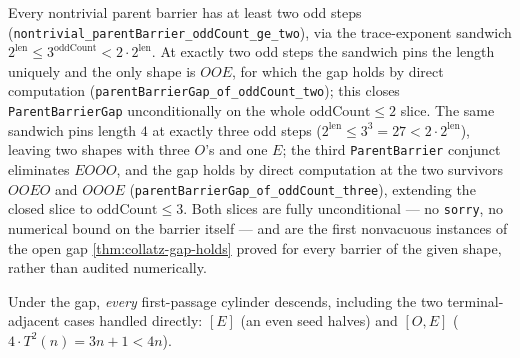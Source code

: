 \begin{theorem}
  \label{thm:collatz-gap-small-oddcount-slice}
  \leanok
  Every nontrivial parent barrier has at least two odd steps
  (\texttt{nontrivial\_parentBarrier\_oddCount\_ge\_two}), via the trace-exponent
  sandwich $2^{\mathrm{len}}\le3^{\mathrm{oddCount}}<2\cdot2^{\mathrm{len}}$. At
  exactly two odd steps the sandwich pins the length uniquely and the only shape is
  $OOE$, for which the gap holds by direct computation
  (\texttt{parentBarrierGap\_of\_oddCount\_two}); this closes
  \texttt{ParentBarrierGap} unconditionally on the whole $\mathrm{oddCount}\le2$
  slice. The same sandwich pins length $4$ at exactly three odd steps
  ($2^{\mathrm{len}}\le3^3=27<2\cdot2^{\mathrm{len}}$), leaving two shapes with
  three $O$'s and one $E$; the third \texttt{ParentBarrier} conjunct eliminates
  $EOOO$, and the gap holds by direct computation at the two survivors $OOEO$ and
  $OOOE$ (\texttt{parentBarrierGap\_of\_oddCount\_three}), extending the closed
  slice to $\mathrm{oddCount}\le3$. Both slices are fully unconditional --- no
  \texttt{sorry}, no numerical bound on the barrier itself --- and are the first
  nonvacuous instances of the open gap \cref{thm:collatz-gap-holds} proved for
  every barrier of the given shape, rather than audited numerically.
\end{theorem}
\begin{theorem}
  \label{thm:collatz-all-firstpassage-descent}
  \leanok
  Under the gap, \emph{every} first-passage cylinder descends, including the two
  terminal-adjacent cases handled directly: $[E]$ (an even seed halves) and $[O,E]$
  ($4\cdot T^2(n)=3n+1<4n$).
\end{theorem}
